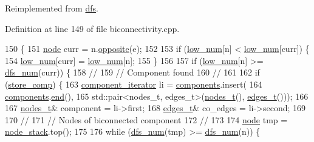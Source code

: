 Reimplemented from \mbox{\hyperlink{classdfs_a92fdca8a77b55d08b129aeab4fc66e4c}{dfs}}.



Definition at line 149 of file biconnectivity.\+cpp.


\begin{DoxyCode}
150 \{
151     \mbox{\hyperlink{classnode}{node}} curr = n.\mbox{\hyperlink{classnode_a13dbd1809a33a5efede64a359e53a363}{opposite}}(e);
152 
153     \textcolor{keywordflow}{if} (\mbox{\hyperlink{classbiconnectivity_ac5817e2122477ed591ef229c081745f3}{low\_num}}[n] < \mbox{\hyperlink{classbiconnectivity_ac5817e2122477ed591ef229c081745f3}{low\_num}}[curr]) \{
154         \mbox{\hyperlink{classbiconnectivity_ac5817e2122477ed591ef229c081745f3}{low\_num}}[curr] = \mbox{\hyperlink{classbiconnectivity_ac5817e2122477ed591ef229c081745f3}{low\_num}}[n];
155     \}
156 
157     \textcolor{keywordflow}{if} (\mbox{\hyperlink{classbiconnectivity_ac5817e2122477ed591ef229c081745f3}{low\_num}}[n] >= \mbox{\hyperlink{classdfs_a315f16831a0bd333960e87e045cb37c8}{dfs\_num}}(curr)) \{
158         \textcolor{comment}{//}
159         \textcolor{comment}{// Component found}
160         \textcolor{comment}{// }
161 
162         \textcolor{keywordflow}{if} (\mbox{\hyperlink{classbiconnectivity_a989307b07f4a976649bd7551173bd564}{store\_comp}}) \{
163             \mbox{\hyperlink{classbiconnectivity_aef69aa0c23bfcd945e385350154b6483}{component\_iterator}} li = \mbox{\hyperlink{classcomponents}{components}}.insert(
164                 \mbox{\hyperlink{classcomponents}{components}}.\mbox{\hyperlink{classdfs_af847633fa642258d3522e8deb26aef37}{end}}(),
165                 std::pair<nodes\_t, edges\_t>(\mbox{\hyperlink{edge_8h_a22ac17689106ba21a84e7bc54d1199d6}{nodes\_t}}(), \mbox{\hyperlink{edge_8h_a8f9587479bda6cf612c103494b3858e3}{edges\_t}}()));
166 
167             \mbox{\hyperlink{edge_8h_a22ac17689106ba21a84e7bc54d1199d6}{nodes\_t}}& component = li->first;
168             \mbox{\hyperlink{edge_8h_a8f9587479bda6cf612c103494b3858e3}{edges\_t}}& co\_edges = li->second;
169 
170             \textcolor{comment}{//}
171             \textcolor{comment}{// Nodes of biconnected component}
172             \textcolor{comment}{// }
173 
174             \mbox{\hyperlink{classnode}{node}} tmp = \mbox{\hyperlink{classbiconnectivity_a1223b0d8a833eb6299e82290b3e8ac8f}{node\_stack}}.top();
175 
176             \textcolor{keywordflow}{while} (\mbox{\hyperlink{classdfs_a315f16831a0bd333960e87e045cb37c8}{dfs\_num}}(tmp) >= \mbox{\hyperlink{classdfs_a315f16831a0bd333960e87e045cb37c8}{dfs\_num}}(n)) \{

\end{DoxyCode}
